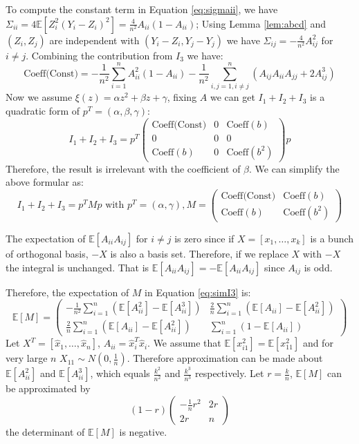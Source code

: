 \documentclass{article}
\def\E{\mathbb{E}}
\begin{document}
To compute the constant term in Equation \eqref{eq:sigmaii}, we have $\Sigma_{ii} = 4\E[Z_i^2 (Y_i-Z_i)^2] = \frac{4}{n^2} A_{ii}(1-A_{ii})$;
Using Lemma \ref{lem:abcd} and $(Z_i, Z_j)$ are independent with $(Y_i - Z_i, Y_j - Y_j)$ we have $\Sigma_{ij} = -\frac{4}{n^2} A_{ij}^2$ for $i \neq j$. Combining the contribution from $I_3$ we have:
\begin{equation}
\textrm{Coeff(Const)} = -\frac{1}{n^2} \sum_{i=1}^n A^2_{ii} (1 -A_{ii}) - \frac{1}{n^2} \sum_{i,j=1,i\neq j}^n (A_{ij}A_{ii}A_{jj} + 2 A_{ij}^3)
\end{equation}
Now we assume $\xi(z) = \alpha z^2 + \beta z + \gamma$, fixing $A$ we can get $I_1 + I_2 + I_3$ is a quadratic form of $p^T = (\alpha, \beta, \gamma)$:
$$
I_1 + I_2 + I_3 =p^T \begin{pmatrix} 
\textrm{Coeff(Const)}  & 0 & \textrm{Coeff}(b) \\ 
0  & 0 & 0 \\ 
\textrm{Coeff}(b)   & 0 & \textrm{Coeff}(b^2) 
\end{pmatrix} p
$$
Therefore, the result is irrelevant with the coefficient of $\beta$.  We can simplify the above formular as:
\begin{equation}\label{eq:simI3}
I_1+I_2+I_3 = p^T M p \textrm{ with } p^T = (\alpha, \gamma), M = \begin{pmatrix} \textrm{Coeff(Const)}  &  \textrm{Coeff}(b) \\ \textrm{Coeff}(b) &  \textrm{Coeff}(b^2)  \end{pmatrix}
\end{equation}

The expectation of $\E[A_{ii} A_{ij}]$ for $i \neq j $ is zero since if $X= [x_1, \dots, x_k]$ is a bunch of orthogonal basis, $-X$ is also a basis set. Therefore, if we replace $X$ with $-X$ the integral is unchanged. That is $\E[A_{ii} A_{ij}] = -\E[A_{ii}A_{ij}]$ since $A_{ij}$ is odd. 

Therefore, the expectation of $M$ in Equation \ref{eq:simI3} is:
\begin{equation}\label{eq:2t2}
\E[M] = \begin{pmatrix} -\frac{1}{n^2} \sum_{i=1}^n (\E[A_{ii}^2 ]-\E[A_{ii}^3]) & \frac{2}{n} \sum_{i=1}^n (\E[A_{ii}]-\E[A^2_{ii}]) \\
\frac{2}{n} \sum_{i=1}^n (\E[A_{ii}]-\E[A^2_{ii}]) & \sum_{i=1}^n (1-\E[A_{ii}])
 \end{pmatrix}
\end{equation}
Let $X^T=[\hat{x}_1, \dots, \hat{x}_n]$, $A_{ii}= \hat{x}_i^T \hat{x}_i$. We assume that $\E[x_{i1}^2] = \E[x_{11}^2]$ and for very large $n$ $X_{11} \sim N(0,\frac{1}{n})$. Therefore
approximation can be made about $\E[A_{ii}^2]$ and 
$\E[A_{ii}^3]$, which equals $\frac{k^2}{n^2}$ and $\frac{k^3}{n^3}$ respectively. Let $ r = \frac{k}{n}$, 
$\E[M] $ can be approximated by 
$$
(1-r)\begin{pmatrix}
-\frac{1}{n}r^2 & 2r \\
2r & n
\end{pmatrix}
$$
the determinant of $\E[M]$ is negative. 
\end{document}
